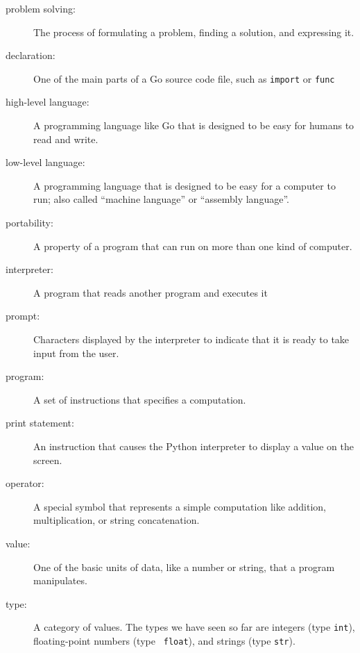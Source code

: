 \begin{description}

\item[problem solving:]  The process of formulating a problem, finding
a solution, and expressing it.

\item[declaration:] One of the main parts of a Go source code file, such
as {\tt import} or {\tt func} 

\item[high-level language:]  A programming language like Go that
is designed to be easy for humans to read and write.

\item[low-level language:]  A programming language that is designed
to be easy for a computer to run; also called ``machine language'' or
``assembly language''.

\item[portability:]  A property of a program that can run on more
than one kind of computer.

\item[interpreter:]  A program that reads another program and executes
it

\item[prompt:] Characters displayed by the interpreter to indicate
that it is ready to take input from the user.

\item[program:] A set of instructions that specifies a computation.

\item[print statement:]  An instruction that causes the Python
interpreter to display a value on the screen.

\item[operator:]  A special symbol that represents a simple computation like
addition, multiplication, or string concatenation.

\item[value:]  One of the basic units of data, like a number or string, 
that a program manipulates.

\item[type:] A category of values. The types we have seen so far
are integers (type {\tt int}), floating-point numbers (type {\tt
float}), and strings (type {\tt str}).


\end{description}
